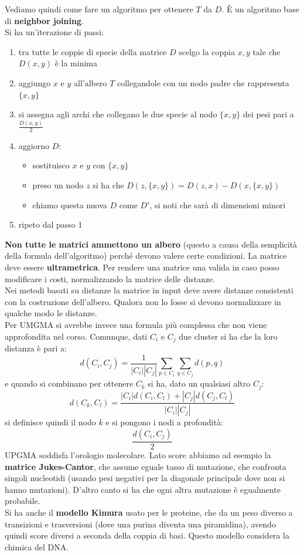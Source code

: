 \documentclass[a4paper,12pt, oneside]{book}
\begin{document}
Vediamo quindi come fare un algoritmo per ottenere $T$ da $D$. È un algoritmo
base di \textbf{neighbor joining}.\\
Si ha un'iterazione di passi:
\begin{enumerate}
\item tra tutte le coppie di specie della matrice $D$ scelgo la coppia $x,y$
  tale che $D(x,y)$ è la minima
\item aggiungo $x$ e $y$ all'albero $T$ collegandole con un nodo padre che
  rappresenta $\{x,y\}$
\item si assegna agli archi che collegano le due specie al nodo $\{x,y\}$ dei
  pesi pari a $\frac{D(x,y)}{2}$
\item aggiorno $D$:
  \begin{itemize}
  \item sostituisco $x$ e $y$ con $\{x,y\}$
  \item preso un nodo $z$ si ha che $D(z,\{x,y\})=D(z,x)-D(x,\{x,y\})$
  \item chiamo questa nuova $D$ come $D'$, si noti che sarà di dimensioni minori
  \end{itemize}
\item ripeto dal passo 1
\end{enumerate}
\textbf{Non tutte le matrici ammettono un albero} (questo a causa della
semplicità della formula dell'algoritmo) perché devono valere certe
condizioni. La matrice deve essere \textbf{ultrametrica}. Per rendere una
matrice una valida in caso posso modificare i costi, normalizzando la matrice
delle distanze.\\
Nei metodi basati su distanze la matrice in input deve avere distanze
consistenti con la costruzione dell'albero. Qualora non lo fosse si devono
normalizzare in qualche modo le distanze.\\
Per UMGMA si avrebbe invece una formula più complessa che non viene
approfondita nel corso. Comunque, dati $C_i$ e $C_j$ due cluster si ha che la
loro distanza è pari a:
\[d(C_i,C_j)=\frac{1}{|C_i||C_j|}\sum_{p\in C_i}\sum_{q\in C_j}d(p,q)\]
e quando si combinano per ottenere $C_k$ si ha, dato un qualsiasi altro $C_j$:
\[d(C_k, C_l)=\frac{|C_i|d(C_i,C_l)+|C_j|d(C_j,C_l)}{|C_i||C_j|}\]
si definisce quindi il nodo $k$ e si pongono i nodi a profondità:
\[\frac{d(C_i,C_j)}{2}\]
UPGMA soddisfa l'orologio molecolare.
Lato score abbiamo ad esempio la \textbf{matrice Jukes-Cantor}, che assume
eguale tasso
di mutazione, che confronta singoli nucleotidi (usando pesi negativi per la
diagonale principale dove non si hanno mutazioni). D'altro canto si ha che ogni
altra mutazione è egualmente probabile.\\
Si ha anche il \textbf{modello Kimura} usato per le proteine, che da un peso
diverso a
transizioni e trasversioni (dove una purina diventa una piramidina), avendo
quindi score diversi a seconda della coppia di basi. Questo modello considera
la chimica del DNA.
\end{document}
